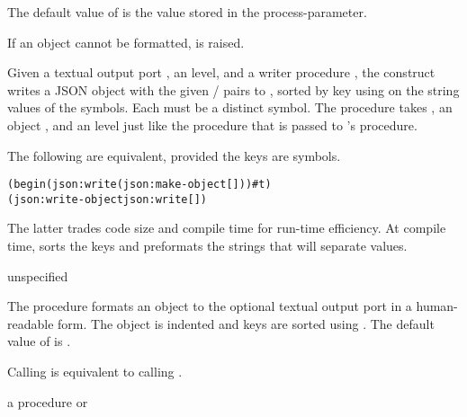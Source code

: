 The default value of  is the value stored in the
 process-parameter.

If an object cannot be formatted, 
is raised.

\begin{syntax}
\end{syntax}
\returns{} 

Given a textual output port , an  level, and a
writer procedure , the  construct
writes a JSON object with the given  /  pairs to
, sorted by key using  on the string values of
the symbols.  Each  must be a distinct symbol.  The 
procedure takes , an object , and an  level
just like the  procedure that is passed to 's
 procedure.

The following are equivalent, provided the keys are symbols.

\antipar\begin{alltt}
(begin (json:write  (json:make-object [ ] \etc) ) \#t)
(json:write-object   json:write [ ] \etc)\end{alltt}\antipar

The latter trades code size and compile time for run-time efficiency.
At compile time,  sorts the keys and
preformats the strings that will separate values.

\begin{procedure}
\end{procedure}
\returns{} unspecified

The  procedure formats an object  to the
optional textual output port  in a human-readable form. The
object is indented and keys are sorted using
. The default value of  is
.

Calling  is equivalent to calling
.

\begin{parameter}
\end{parameter}
\returns{} a procedure or 

